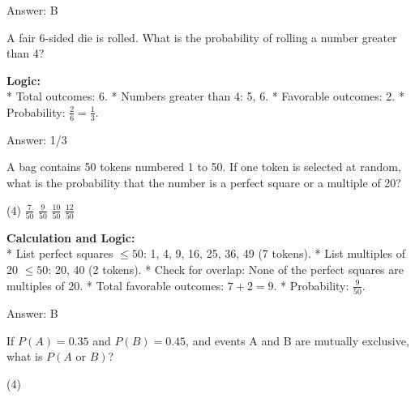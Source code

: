 \documentclass[11pt,paper=a4,answers]{exam}
\begin{document}
\begin{questions}
\begin{solution}
\vspace{30pt}

Answer: \colorbox{yellow!100}{B}
\end{solution}

\vspace{60pt}

\question
A fair 6-sided die is rolled. What is the probability of rolling a number greater than 4?

\begin{solution}
\textbf{Logic:} \\
* Total outcomes: 6.
* Numbers greater than 4: 5, 6.
* Favorable outcomes: 2.
* Probability: $\frac{2}{6} = \frac{1}{3}$.

\vspace{30pt}

Answer: \colorbox{yellow!100}{1/3}
\end{solution}

\vspace{60pt}

\question
A bag contains 50 tokens numbered 1 to 50. If one token is selected at random, what is the probability that the number is a perfect square or a multiple of 20?
\begin{tasks}(4)
    \task $\frac{7}{50}$
    \task $\frac{9}{50}$
    \task $\frac{10}{50}$
    \task $\frac{12}{50}$
\end{tasks}

\begin{solution}
\textbf{Calculation and Logic:} \\
* List perfect squares $\le 50$: 1, 4, 9, 16, 25, 36, 49 (7 tokens).
* List multiples of 20 $\le 50$: 20, 40 (2 tokens).
* Check for overlap: None of the perfect squares are multiples of 20.
* Total favorable outcomes: $7 + 2 = 9$.
* Probability: $\frac{9}{50}$.

\vspace{30pt}

Answer: \colorbox{yellow!100}{B}
\end{solution}

\vspace{60pt}

\question
If $P(A) = 0.35$ and $P(B) = 0.45$, and events A and B are mutually exclusive, what is $P(A \text{ or } B)$?
\begin{tasks}(4)
\end{tasks}


\end{questions}
\end{document}
